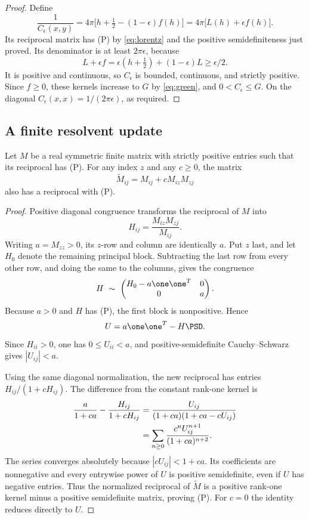 \begin{proof}
Define
\begin{equation}\label{eq:C-epsilon}
\frac1{C_\epsilon(x,y)}
=4\pi\bigl[h+\tfrac12-(1-\epsilon)f(h)\bigr]
=4\pi\bigl[L(h)+\epsilon f(h)\bigr].
\end{equation}
Its reciprocal matrix has \textup{(P)} by \eqref{eq:lorentz} and the positive semidefiniteness just proved. Its denominator is at least $2\pi\epsilon$, because
\[
L+\epsilon f=\epsilon(h+\tfrac12)+(1-\epsilon)L\ge\epsilon/2.
\]
It is positive and continuous, so $C_\epsilon$ is bounded, continuous, and strictly positive. Since $f\ge0$, these kernels increase to $G$ by \eqref{eq:green}, and $0<C_\epsilon\le G$. On the diagonal $C_\epsilon(x,x)=1/(2\pi\epsilon)$, as required.
\end{proof}

\subsection{A finite resolvent update}

\begin{lemma}\label{lem:update}
Let $M$ be a real symmetric finite matrix with strictly positive entries such that its reciprocal has \textup{(P)}. For any index $z$ and any $c\ge0$, the matrix
\[
\widetilde M_{ij}=M_{ij}+cM_{iz}M_{zj}
\]
also has a reciprocal with \textup{(P)}.
\end{lemma}
\begin{proof}
Positive diagonal congruence transforms the reciprocal of $M$ into
\[
H_{ij}=\frac{M_{iz}M_{zj}}{M_{ij}}.
\]
Writing $a=M_{zz}>0$, its $z$-row and column are identically $a$. Put $z$ last, and let $H_0$ denote the remaining principal block. Subtracting the last row from every other row, and doing the same to the columns, gives the congruence
\[
H\ \sim\
\begin{pmatrix}H_0-a\one\one^T&0\\0&a\end{pmatrix}.
\]
Because $a>0$ and $H$ has \textup{(P)}, the first block is nonpositive. Hence
\[
U=a\one\one^T-H\PSD.
\]
Since $H_{ii}>0$, one has $0\le U_{ii}<a$, and positive-semidefinite Cauchy--Schwarz gives $|U_{ij}|<a$.

Using the same diagonal normalization, the new reciprocal has entries $H_{ij}/(1+cH_{ij})$. The difference from the constant rank-one kernel is
\begin{align}
\frac a{1+ca}-\frac{H_{ij}}{1+cH_{ij}}
&=\frac{U_{ij}}{(1+ca)(1+ca-cU_{ij})}\notag\\
&=\sum_{n\ge0}\frac{c^nU_{ij}^{n+1}}{(1+ca)^{n+2}}.\label{eq:update-series}
\end{align}
The series converges absolutely because $|cU_{ij}|<1+ca$. Its coefficients are nonnegative and every entrywise power of $U$ is positive semidefinite, even if $U$ has negative entries. Thus the normalized reciprocal of $\widetilde M$ is a positive rank-one kernel minus a positive semidefinite matrix, proving \textup{(P)}. For $c=0$ the identity reduces directly to $U$.
\end{proof}

